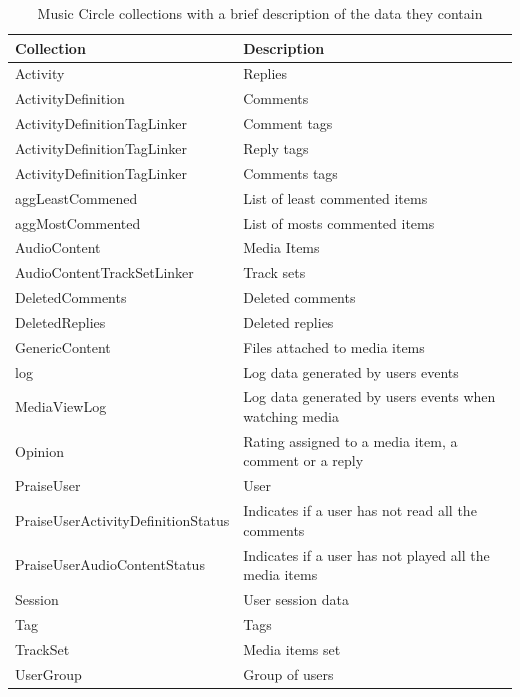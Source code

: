 \documentclass[11pt, oneside]{article}   	%
\begin{document}
\begin{table}[h]
	\centering
	\begin{tabularx}{\linewidth}{|X|X|}
		\hline
		 \textbf{Collection} & \textbf{Description}\\ \hline
		 Activity & Replies \\ \hline
		 ActivityDefinition & Comments \\ \hline
		 ActivityDefinitionTagLinker & Comment tags \\ \hline
		 ActivityDefinitionTagLinker & Reply tags \\ \hline
		 ActivityDefinitionTagLinker & Comments tags \\ \hline
		 aggLeastCommened & List of least commented items \\ \hline
		 aggMostCommented & List of mosts commented items \\ \hline
		 AudioContent & Media Items \\ \hline
		 AudioContentTrackSetLinker &Track sets \\ \hline
		 DeletedComments & Deleted comments \\ \hline
		 DeletedReplies & Deleted replies \\ \hline
		 GenericContent & Files attached to media items \\ \hline
		 log & Log data generated by users events \\ \hline
		 MediaViewLog & Log data generated by users events when watching media \\ \hline
		 Opinion & Rating assigned to a media item, a comment or a reply\\ \hline
		 PraiseUser & User \\ \hline
		 PraiseUserActivityDefinitionStatus & Indicates if a user has not read all the comments \\ \hline
		 PraiseUserAudioContentStatus & Indicates if a user has not played all the media items \\ \hline
		 Session & User session data \\ \hline
		 Tag & Tags \\ \hline
		 TrackSet & Media items set \\ \hline
		 UserGroup & Group of users \\ \hline
	\end{tabularx}
	\caption{Music Circle collections with a brief description of the data they contain}
	\label{table:musicCircleDatabase}
\end{table}
\end{document}
